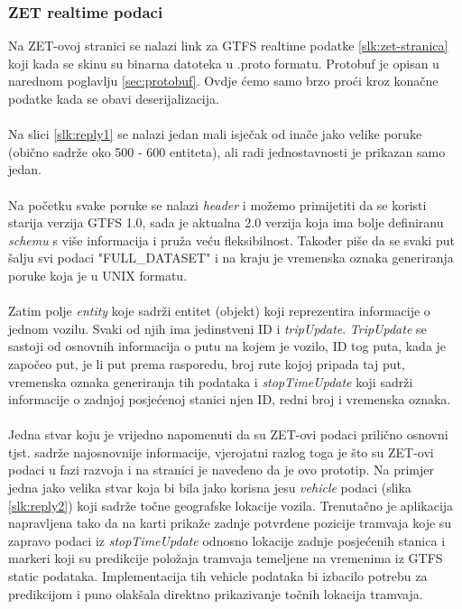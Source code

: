 \documentclass[zavrsnirad]{fer}
\begin{document}
\subsubsection{ZET realtime podaci}
Na ZET-ovoj stranici se nalazi link za GTFS realtime podatke \ref{slk:zet-stranica} koji kada se skinu su binarna datoteka u .proto formatu. Protobuf je opisan u narednom poglavlju \ref{sec:protobuf}. Ovdje ćemo samo brzo proći kroz konačne podatke kada se obavi deserijalizacija.\\\\
Na slici \ref{slk:reply1} se nalazi jedan mali isječak od inače jako velike poruke (obično sadrže oko 500 - 600 entiteta), ali radi jednostavnosti je prikazan samo jedan.\\\\
Na početku svake poruke se nalazi \textit{header} i možemo primijetiti da se koristi starija verzija GTFS 1.0, sada je aktualna 2.0 verzija koja ima bolje definiranu \textit{schemu} s više informacija i pruža veću fleksibilnost. Također piše da se svaki put šalju svi podaci "FULL\_DATASET" i na kraju je vremenska oznaka generiranja poruke koja je u UNIX formatu.\\\\
Zatim polje \textit{entity} koje sadrži entitet (objekt) koji reprezentira informacije o jednom vozilu. Svaki od njih ima jedinstveni ID i \textit{tripUpdate}. \textit{TripUpdate} se sastoji od osnovnih informacija o putu na kojem je vozilo, ID tog puta, kada je započeo put, je li put prema rasporedu, broj rute kojoj pripada taj put, vremenska oznaka generiranja tih podataka i \textit{stopTimeUpdate} koji sadrži informacije o zadnjoj posjećenoj stanici njen ID, redni broj i vremenska oznaka.\\\\
Jedna stvar koju je vrijedno napomenuti da su ZET-ovi podaci prilično osnovni tjst. sadrže najosnovnije informacije, vjerojatni razlog toga je što su ZET-ovi podaci u fazi razvoja i na stranici je navedeno da je ovo prototip. Na primjer jedna jako velika stvar koja bi bila jako korisna jesu \textit{vehicle} podaci (slika \ref{slk:reply2}) koji sadrže točne geografske lokacije vozila. Trenutačno je aplikacija napravljena tako da na karti prikaže zadnje potvrđene pozicije tramvaja koje su zapravo podaci iz \textit{stopTimeUpdate} odnosno lokacije zadnje posjećenih stanica i markeri koji su predikcije položaja tramvaja temeljene na vremenima iz GTFS static podataka. Implementacija tih vehicle podataka bi izbacilo potrebu za predikcijom i puno olakšala direktno prikazivanje točnih lokacija tramvaja.
\end{document}
